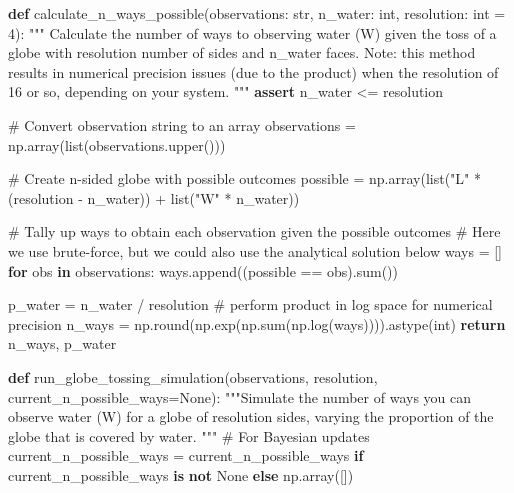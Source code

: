 \documentclass[
  letterpaper,
  DIV=11,
  numbers=noendperiod]{scrreprt}
\newenvironment{Shaded}{\begin{snugshade}}{\end{snugshade}}
\newcommand{\BuiltInTok}[1]{\textcolor[rgb]{0.00,0.23,0.31}{#1}}
\newcommand{\CommentTok}[1]{\textcolor[rgb]{0.37,0.37,0.37}{#1}}
\newcommand{\ControlFlowTok}[1]{\textcolor[rgb]{0.00,0.23,0.31}{\textbf{#1}}}
\newcommand{\DecValTok}[1]{\textcolor[rgb]{0.68,0.00,0.00}{#1}}
\newcommand{\KeywordTok}[1]{\textcolor[rgb]{0.00,0.23,0.31}{\textbf{#1}}}
\newcommand{\NormalTok}[1]{\textcolor[rgb]{0.00,0.23,0.31}{#1}}
\newcommand{\OperatorTok}[1]{\textcolor[rgb]{0.37,0.37,0.37}{#1}}
\newcommand{\StringTok}[1]{\textcolor[rgb]{0.13,0.47,0.30}{#1}}
\newcommand{\VariableTok}[1]{\textcolor[rgb]{0.07,0.07,0.07}{#1}}
\begin{document}
\begin{Shaded}
\begin{Highlighting}[]
\KeywordTok{def}\NormalTok{ calculate\_n\_ways\_possible(observations: }\BuiltInTok{str}\NormalTok{, n\_water: }\BuiltInTok{int}\NormalTok{, resolution: }\BuiltInTok{int} \OperatorTok{=} \DecValTok{4}\NormalTok{):}
    \CommentTok{"""}
\CommentTok{    Calculate the number of ways to observing water (\textquotesingle{}W\textquotesingle{}) given the toss of a globe}
\CommentTok{    with \textasciigrave{}resolution\textasciigrave{} number of sides and \textasciigrave{}n\_water\textasciigrave{} faces.}
\CommentTok{    }
\CommentTok{    Note: this method results in numerical precision issues (due to the product) when the}
\CommentTok{    resolution of 16 or so, depending on your system.}
\CommentTok{    """}
    \ControlFlowTok{assert}\NormalTok{ n\_water }\OperatorTok{\textless{}=}\NormalTok{ resolution}
    
    \CommentTok{\# Convert observation string to an array}
\NormalTok{    observations }\OperatorTok{=}\NormalTok{ np.array(}\BuiltInTok{list}\NormalTok{(observations.upper()))}
    
    \CommentTok{\# Create n{-}sided globe with possible outcomes}
\NormalTok{    possible }\OperatorTok{=}\NormalTok{ np.array(}\BuiltInTok{list}\NormalTok{(}\StringTok{"L"} \OperatorTok{*}\NormalTok{ (resolution }\OperatorTok{{-}}\NormalTok{ n\_water)) }\OperatorTok{+} \BuiltInTok{list}\NormalTok{(}\StringTok{"W"} \OperatorTok{*}\NormalTok{ n\_water))}
    
    \CommentTok{\# Tally up ways to obtain each observation given the possible outcomes}
    \CommentTok{\# Here we use brute{-}force, but we could also use the analytical solution below}
\NormalTok{    ways }\OperatorTok{=}\NormalTok{ []}
    \ControlFlowTok{for}\NormalTok{ obs }\KeywordTok{in}\NormalTok{ observations:}
\NormalTok{        ways.append((possible }\OperatorTok{==}\NormalTok{ obs).}\BuiltInTok{sum}\NormalTok{())}
    
\NormalTok{    p\_water }\OperatorTok{=}\NormalTok{ n\_water }\OperatorTok{/}\NormalTok{ resolution}
    \CommentTok{\# perform product in log space for numerical precision}
\NormalTok{    n\_ways }\OperatorTok{=}\NormalTok{ np.}\BuiltInTok{round}\NormalTok{(np.exp(np.}\BuiltInTok{sum}\NormalTok{(np.log(ways)))).astype(}\BuiltInTok{int}\NormalTok{)}
    \ControlFlowTok{return}\NormalTok{ n\_ways, p\_water}


\KeywordTok{def}\NormalTok{ run\_globe\_tossing\_simulation(observations, resolution, current\_n\_possible\_ways}\OperatorTok{=}\VariableTok{None}\NormalTok{):}
    \CommentTok{"""Simulate the number of ways you can observe water (\textquotesingle{}W\textquotesingle{}) for a globe of \textasciigrave{}resolution\textasciigrave{}}
\CommentTok{    sides, varying the proportion of the globe that is covered by water.}
\CommentTok{    """}
    \CommentTok{\# For Bayesian updates}
\NormalTok{    current\_n\_possible\_ways }\OperatorTok{=}\NormalTok{ current\_n\_possible\_ways }\ControlFlowTok{if}\NormalTok{ current\_n\_possible\_ways }\KeywordTok{is} \KeywordTok{not} \VariableTok{None} \ControlFlowTok{else}\NormalTok{ np.array([])}
    

\end{Highlighting}
\end{Shaded}
\end{document}
